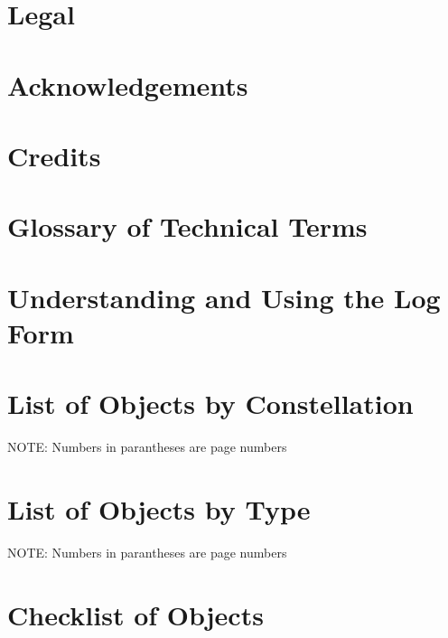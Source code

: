 \documentclass[a4paper,oneside]{book}
\begin{document}
\author{The Astronomy Logbook Project}



\chapter{Legal}
\label{Legal}



\chapter{Acknowledgements}



\chapter{Credits}



\mainmatter

\chapter{Glossary of Technical Terms}



\chapter{Understanding and Using the Log Form}



\setlength{\hangindent}{0cm}
\setlength{\parindent}{0cm}

\twocolumn
\chapter{List of Objects by Constellation}
NOTE: Numbers in parantheses are page numbers \\



\chapter{List of Objects by Type}
NOTE: Numbers in parantheses are page numbers \\


\onecolumn

\chapter{Checklist of Objects}
\setlength{\marginparwidth}{0.1in}
\setlength{\marginparsep}{0in}
\setlength{\leftmargin}{-0.5in}
\end{document}

